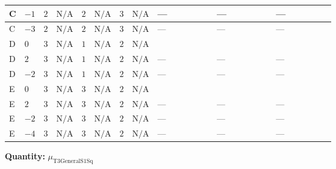 \documentclass[8pt]{article}
\begin{document}
\begin{landscape}
\begin{longtable}{@{}llcccccc >{\raggedright\arraybackslash}p{0.21\linewidth} >{\raggedright\arraybackslash}p{0.21\linewidth} >{\raggedright\arraybackslash}p{0.21\linewidth}@{}}
\midrule
C & $-1$ & $2$ & $\text{N/A}$ & $2$ & $\text{N/A}$ & $3$ & $\text{N/A}$ & --- & --- & --- \\
\midrule
C & $-3$ & $2$ & $\text{N/A}$ & $2$ & $\text{N/A}$ & $3$ & $\text{N/A}$ & --- & --- & --- \\
\midrule
D & $0$ & $3$ & $\text{N/A}$ & $1$ & $\text{N/A}$ & $2$ & $\text{N/A}$ & \scriptsize\adjustbox{max width=\linewidth}{$\begin{gathered} +10 {\lambda_{X_{9}}} {m_1^2}\end{gathered}$} & \scriptsize\adjustbox{max width=\linewidth}{$\begin{gathered} -12 {g_2}^2 {\mu_{\mathrm{T3GeneralS1Sq}}}\end{gathered}$} & \scriptsize\adjustbox{max width=\linewidth}{$\begin{gathered} -4 {\lambda_{S_1}^{(A)}} {\mu_{\mathrm{T3GeneralS1Sq}}}\end{gathered}$} \\
\midrule
D & $2$ & $3$ & $\text{N/A}$ & $1$ & $\text{N/A}$ & $2$ & $\text{N/A}$ & --- & --- & --- \\
\midrule
D & $-2$ & $3$ & $\text{N/A}$ & $1$ & $\text{N/A}$ & $2$ & $\text{N/A}$ & --- & --- & --- \\
\midrule
E & $0$ & $3$ & $\text{N/A}$ & $3$ & $\text{N/A}$ & $2$ & $\text{N/A}$ & \scriptsize\adjustbox{max width=\linewidth}{$\begin{gathered} +10 {\lambda_{X_{9}}} {m_1^2}\end{gathered}$} & \scriptsize\adjustbox{max width=\linewidth}{$\begin{gathered} -12 {g_2}^2 {\mu_{\mathrm{T3GeneralS1Sq}}}\end{gathered}$} & \scriptsize\adjustbox{max width=\linewidth}{$\begin{gathered} -4 {\lambda_{S_1}^{(A)}} {\mu_{\mathrm{T3GeneralS1Sq}}}\end{gathered}$} \\
\midrule
E & $2$ & $3$ & $\text{N/A}$ & $3$ & $\text{N/A}$ & $2$ & $\text{N/A}$ & --- & --- & --- \\
\midrule
E & $-2$ & $3$ & $\text{N/A}$ & $3$ & $\text{N/A}$ & $2$ & $\text{N/A}$ & --- & --- & --- \\
\midrule
E & $-4$ & $3$ & $\text{N/A}$ & $3$ & $\text{N/A}$ & $2$ & $\text{N/A}$ & --- & --- & --- \\
\midrule
\bottomrule
\end{longtable}
\clearpage
\noindent\textbf{Quantity: }${\mu_{\mathrm{T3GeneralS1Sq}}}$\par\smallskip

\end{landscape}
\end{document}
